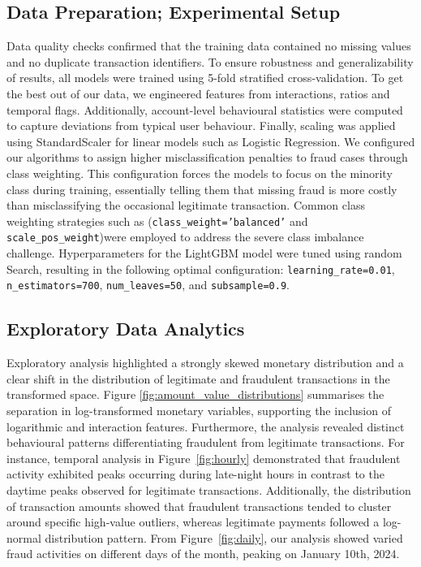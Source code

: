 \documentclass[a4paper,fleqn]{cas-sc}
\begin{document}
\subsection{Data Preparation; Experimental Setup}
Data quality checks confirmed that the training data contained no missing values and no duplicate transaction identifiers. To ensure robustness and generalizability of results, all models were trained using 5-fold stratified cross-validation. To get the best out of our data, we engineered features from interactions, ratios and temporal flags. Additionally, account-level behavioural statistics were computed to capture deviations from typical user behaviour. Finally, scaling was applied using StandardScaler for linear models such as Logistic Regression. We configured our algorithms to assign higher misclassification penalties to fraud cases through class weighting. This configuration forces the models to focus on the minority class during training, essentially telling them that missing fraud is more costly than misclassifying the occasional legitimate transaction. Common class weighting strategies such as (\texttt{class\_weight='balanced'} and \texttt{scale\_pos\_weight})were employed to address the severe class imbalance challenge. Hyperparameters for the LightGBM model were tuned using random Search, resulting in the following optimal configuration: \texttt{learning\_rate=0.01}, \texttt{n\_estimators=700}, \texttt{num\_leaves=50}, and \texttt{subsample=0.9}.

\FloatBarrier
\subsection{Exploratory Data Analytics}

Exploratory analysis highlighted a strongly skewed monetary distribution and a clear shift in the distribution of legitimate and fraudulent transactions in the transformed space. Figure \ref{fig:amount_value_distributions} summarises the separation in log-transformed monetary variables, supporting the inclusion of logarithmic and interaction features. Furthermore, the analysis revealed distinct behavioural patterns differentiating fraudulent from legitimate transactions. For instance, temporal analysis in Figure~\ref{fig:hourly} demonstrated that fraudulent activity exhibited peaks occurring during late-night hours in contrast to the daytime peaks observed for legitimate transactions. Additionally, the distribution of transaction amounts showed that fraudulent transactions tended to cluster around specific high-value outliers, whereas legitimate payments followed a log-normal distribution pattern. From Figure~\ref{fig:daily}, our analysis showed varied fraud activities on different days of the month, peaking on January 10th, 2024.
\end{document}
